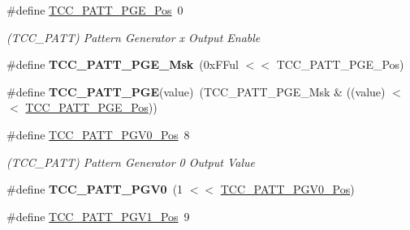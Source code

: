 \begin{DoxyCompactItemize}
\item 
\hypertarget{group___s_a_m_l21___t_c_c_gac5355153b1aaaf997a27712eb2e339b0}{}\#define \hyperlink{group___s_a_m_l21___t_c_c_gac5355153b1aaaf997a27712eb2e339b0}{T\+C\+C\+\_\+\+P\+A\+T\+T\+\_\+\+P\+G\+E\+\_\+\+Pos}~0\label{group___s_a_m_l21___t_c_c_gac5355153b1aaaf997a27712eb2e339b0}

\begin{DoxyCompactList}\small\item\em (T\+C\+C\+\_\+\+P\+A\+T\+T) Pattern Generator x Output Enable \end{DoxyCompactList}\item 
\hypertarget{group___s_a_m_l21___t_c_c_ga4c41f4c65f5685e1a1034e7222c8df2b}{}\#define {\bfseries T\+C\+C\+\_\+\+P\+A\+T\+T\+\_\+\+P\+G\+E\+\_\+\+Msk}~(0x\+F\+Ful $<$$<$ T\+C\+C\+\_\+\+P\+A\+T\+T\+\_\+\+P\+G\+E\+\_\+\+Pos)\label{group___s_a_m_l21___t_c_c_ga4c41f4c65f5685e1a1034e7222c8df2b}

\item 
\hypertarget{group___s_a_m_l21___t_c_c_ga395e8cb444157565522de1464b9931fa}{}\#define {\bfseries T\+C\+C\+\_\+\+P\+A\+T\+T\+\_\+\+P\+G\+E}(value)~(T\+C\+C\+\_\+\+P\+A\+T\+T\+\_\+\+P\+G\+E\+\_\+\+Msk \& ((value) $<$$<$ \hyperlink{group___s_a_m_l21___t_c_c_gac5355153b1aaaf997a27712eb2e339b0}{T\+C\+C\+\_\+\+P\+A\+T\+T\+\_\+\+P\+G\+E\+\_\+\+Pos}))\label{group___s_a_m_l21___t_c_c_ga395e8cb444157565522de1464b9931fa}

\item 
\hypertarget{group___s_a_m_l21___t_c_c_ga392989f28fb1a7b942df6c53062a9f6b}{}\#define \hyperlink{group___s_a_m_l21___t_c_c_ga392989f28fb1a7b942df6c53062a9f6b}{T\+C\+C\+\_\+\+P\+A\+T\+T\+\_\+\+P\+G\+V0\+\_\+\+Pos}~8\label{group___s_a_m_l21___t_c_c_ga392989f28fb1a7b942df6c53062a9f6b}

\begin{DoxyCompactList}\small\item\em (T\+C\+C\+\_\+\+P\+A\+T\+T) Pattern Generator 0 Output Value \end{DoxyCompactList}\item 
\hypertarget{group___s_a_m_l21___t_c_c_ga8a62753ebdf6a64eacecac74ee56d02d}{}\#define {\bfseries T\+C\+C\+\_\+\+P\+A\+T\+T\+\_\+\+P\+G\+V0}~(1 $<$$<$ \hyperlink{group___s_a_m_l21___t_c_c_ga392989f28fb1a7b942df6c53062a9f6b}{T\+C\+C\+\_\+\+P\+A\+T\+T\+\_\+\+P\+G\+V0\+\_\+\+Pos})\label{group___s_a_m_l21___t_c_c_ga8a62753ebdf6a64eacecac74ee56d02d}

\item 
\hypertarget{group___s_a_m_l21___t_c_c_ga81052a1e3771a09ae49ee36ce21169f3}{}\#define \hyperlink{group___s_a_m_l21___t_c_c_ga81052a1e3771a09ae49ee36ce21169f3}{T\+C\+C\+\_\+\+P\+A\+T\+T\+\_\+\+P\+G\+V1\+\_\+\+Pos}~9\label{group___s_a_m_l21___t_c_c_ga81052a1e3771a09ae49ee36ce21169f3}


\end{DoxyCompactItemize}
